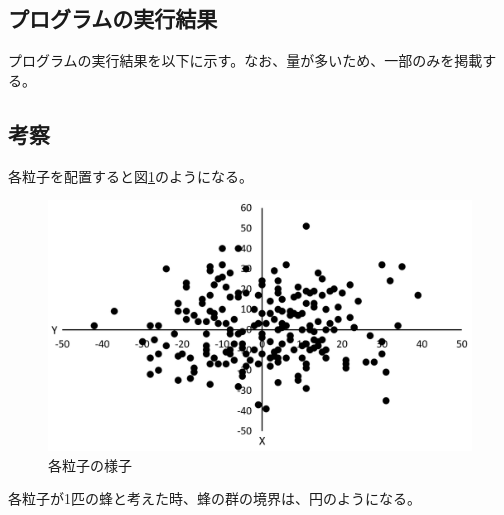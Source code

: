 \documentclass[11pt,titlepage]{jsarticle}
\begin{document}


\subsection{プログラムの実行結果}
プログラムの実行結果を以下に示す。なお、量が多いため、一部のみを掲載する。
\begin{oframed}
\end{oframed}

\subsection{考察}
各粒子を配置すると図\ref{fig:kadai14_2}のようになる。

\begin{figure}[H]
\centering
\includegraphics[width=12cm]{img/kadai14_2.PNG}
\caption{各粒子の様子}
\label{fig:kadai14_2}
\end{figure}

各粒子が1匹の蜂と考えた時、蜂の群の境界は、円のようになる。
\end{document}
